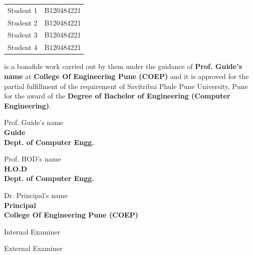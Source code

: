 \documentclass{report} %
\begin{document}
\begin{titlepage}
\begin{center}
			\begin{tabular}{ll}
				Student 1 & B120484221 \\
				Student 2 & B120484221 \\
				Student 3 & B120484221 \\
				Student 4 & B120484221 \\
			\end{tabular}
		\end{center}
		
		\large
		\flushleft
		is a bonafide work carried out by them under the guidance of \textbf {Prof. Guide's name} at \textbf {College Of Engineering Pune (COEP)} and it is approved for the partial fulfillment of the requirement of Savitribai Phule Pune University, Pune for the award of the \textbf {Degree of Bachelor of	Engineering (Computer Engineering)}.
		\vspace{2cm}
		
		\begin{center}
			\begin{multicols}{2}
				Prof. Guide's name \\
				\textbf {Guide} \\
				\textbf {Dept. of Computer Engg.} \\
				\columnbreak
				
				Prof. HOD's name \\
				\textbf {H.O.D} \\
				\textbf {Dept. of Computer Engg.} \\
			\end{multicols}
			\vspace{2cm}
		
		Dr. Principal's name \\
		\textbf {Principal} \\
		\textbf {College Of Engineering Pune (COEP)} \\
		\vspace{2cm}
			
			\begin{multicols}{2}
				Internal Examiner \\
				\columnbreak
				
				External Examiner \\
			\end{multicols}
		\end{center}
	
	\end{titlepage}

\end{document}
